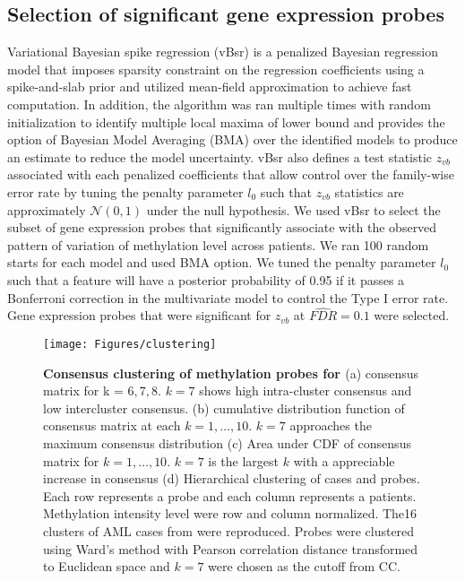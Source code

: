 \documentclass{article}
\begin{document}
\subsection{Selection of significant gene expression probes}
Variational Bayesian spike regression (vBsr) \cite{logsdon2012novel} is a penalized Bayesian regression model that imposes sparsity constraint on the regression coefficients using a spike-and-slab prior and utilized mean-field approximation to achieve fast computation. In addition, the algorithm was ran multiple times with random initialization to identify multiple local maxima of lower bound and provides the option of Bayesian Model Averaging (BMA) over the identified models to produce an estimate to reduce the model uncertainty. vBsr also defines a test statistic $z_{vb}$ associated with each penalized coefficients that allow control over the family-wise error rate by tuning the penalty parameter $l_0$ such that $z_{vb}$ statistics are approximately $\mathcal{N}(0, 1)$ under the null hypothesis. We used vBsr to select the subset of gene expression probes that significantly associate with the observed pattern of variation of methylation level across patients. We ran 100 random starts for each model and used BMA option. We tuned the penalty parameter $l_0$ such that a feature will have a posterior probability of 0.95 if it passes a Bonferroni correction in the multivariate model to control the Type I error rate. Gene expression probes that were significant for $z_{vb}$ at $\widehat{FDR} = 0.1$ were selected. 

\begin{figure*}[htb!]
\centering
\texttt{[image: Figures/clustering]}
\caption{\textbf{Consensus clustering of methylation probes for \citet{figueroa2010dna}} (a) consensus matrix for k = $6, 7, 8$. $k = 7$ shows high intra-cluster consensus and low intercluster consensus. (b) cumulative distribution function of consensus matrix at each $k = 1, \dots, 10$. $k = 7$ approaches the maximum consensus distribution (c) Area under CDF of consensus matrix for $k = 1, \dots, 10$. $k = 7$ is the largest $k$ with a appreciable increase in consensus (d) Hierarchical clustering of cases and probes. Each row represents a probe and each column represents a patients. Methylation intensity level were row and column normalized. The16 clusters of AML cases from \citet{figueroa2010dna} were reproduced. Probes were clustered using Ward's method with Pearson correlation distance transformed to Euclidean space and $k=7$ were chosen as the cutoff from CC.}
\label{CC}
\end{figure*}
\end{document}
